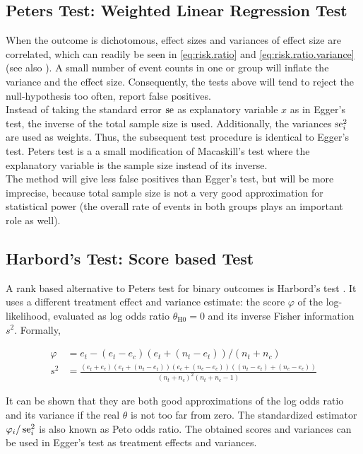 \documentclass[11pt,a4paper,twoside]{book}\usepackage[]{graphicx}\usepackage[]{color}
\begin{document}
\subsection{Peters Test: Weighted Linear Regression Test} \label{sec:Peter}
When the outcome is dichotomous, effect sizes and variances of effect size are correlated, which can readily be seen in \eqref{eq:risk.ratio} and \eqref{eq:risk.ratio.variance} (see also \cite[p. 120]{meta.w.R}). A small number of event counts in one or group will inflate the variance and the effect size. Consequently, the tests above will tend to reject the null-hypothesis too often, \ie report false positives.\\ 
Instead of taking the standard error $\operatorname{se}$ as explanatory variable $x$ as in Egger's test, the inverse of the total sample size is used. Additionally, the variances $\operatorname{se}_i^2$ are used as weights. Thus, the subsequent test procedure is identical to Egger's test. Peters test is a a small modification of Macaskill's test where the explanatory variable is the sample size instead of its inverse. \\
The method will give less false positives than Egger's test, but will be more imprecise, because total sample size is not a very good approximation for statistical power (the overall rate of events in both groups plays an important role as well).



\subsection{Harbord's Test: Score based Test} \label{sec:Harbord}
A rank based alternative to Peters test for binary outcomes is Harbord's test \citep{Harbord}.
It uses a different treatment effect and variance estimate: the score $\varphi$ of the log-likelihood, evaluated as log odds ratio $\theta_\textrm{H0} = 0$ and its inverse Fisher information $s^2$. Formally,

\begin{align}
\varphi &= e_t - (e_t - e_c)(e_t + (n_t - e_t))/(n_t + n_c) \label{harbord.score} \\
 s^2 &= \frac{(e_t + e_c)(e_t + (n_t - e_t))(e_c + (n_c - e_c))((n_t - e_t) + (n_c - e_c))}{(n_t + n_c)^2(n_t + n_c - 1)} \label{harbord.variance}
\end{align}

It can be shown that they are both good approximations of the log odds ratio and its variance if the real $\theta$ is not too far from zero. The standardized estimator $\varphi_i/\operatorname{se}_i^2$ is also known as Peto odds ratio. The obtained scores and variances can be used in Egger's test as treatment effects and variances.
\end{document}
